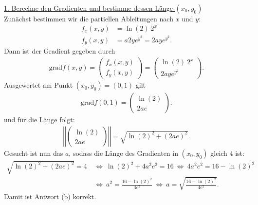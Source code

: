 \underline{1. Berechne den Gradienten und bestimme dessen Länge $(x_0,y_0)$}\\
Zunächst bestimmen wir die partiellen Ableitungen nach $x$ und $y$:
\begin{align*}
	f_x(x,y)
	&=
	\ln(2) \ 2^x\\
	f_y(x,y)
	&=
	a 2y e^{y^2} 
	=
	2ay e^{y^2}.  
\end{align*}
Dann ist der Gradient gegeben durch
\begin{align*}
	\mathrm{grad} f(x,y)
	=
	\begin{pmatrix}
		f_x(x,y) \\
		f_y(x,y)
	\end{pmatrix}
	=
	\begin{pmatrix}
		\ln(2) \ 2^x \\
		2ay e^{y^2}
	\end{pmatrix}.
\end{align*}
Ausgewertet am Punkt $(x_0,y_0) = (0,1)$ gilt
\begin{align*}
	\mathrm{grad} f(0,1)
	=
	\begin{pmatrix}
		\ln(2) \\
		2a e
	\end{pmatrix}.
\end{align*}
und für die Länge folgt:
\begin{align*}
	\left\Vert
	\begin{pmatrix}
		\ln (2) \\
		2a e
	\end{pmatrix}
	\right\Vert
	= 
	\sqrt{\ln(2)^2 + (2ae)^2}.
\end{align*}
Gesucht ist nun das $a$, sodass die Länge des Gradienten in $(x_0,y_0)$ gleich $4$ ist:
\begin{align*}
	\sqrt{\ln(2)^2 + (2ae)^2} = 4
	\ &\Leftrightarrow \
	\ln(2)^2 + 4 a^2e^2 = 16
	\ \Leftrightarrow \
	4 a^2 e^2 = 16 - \ln(2)^2\\
	\ &\Leftrightarrow \
	a^2 = \frac{16 - \ln(2)^2}{4 e^2}
	\ \Leftrightarrow \
	a = \sqrt{\frac{16 - \ln(2)^2}{4 e^2}}.
\end{align*} 
Damit ist Antwort (b) korrekt.



\newpage
